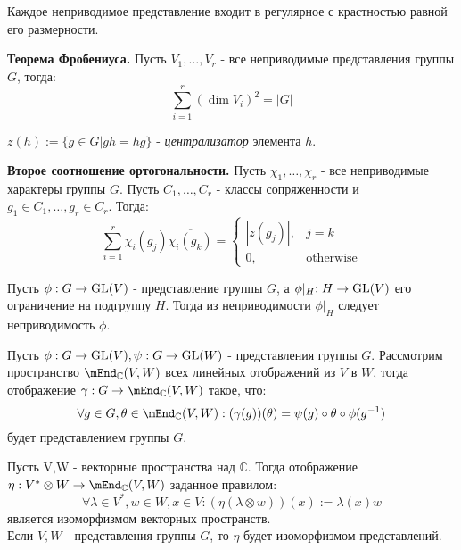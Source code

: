 \begin{ass}
Каждое неприводимое представление входит в регулярное с крастностью равной его размерности.
\end{ass}

\begin{thm}
\textbf{Теорема Фробениуса.} Пусть $V_1,\ldots,V_r$ - все неприводимые представления группы $G$, тогда:
$$\sum_{i=1}^r(\dim V_i)^2 = |G|$$
\end{thm}

\begin{defi}
$z(h):=\{ g\in G | gh=hg\}$ - \textit{централизатор} элемента $h$.
\end{defi}

\begin{thm}
\textbf{Второе соотношение ортогональности.} Пусть $\chi_1,\ldots,\chi_r$ - все неприводимые характеры группы $G$. Пусть $C_1,\ldots,C_r$ - классы сопряженности и $g_1\in C_1,\ldots,g_r\in C_r$. Тогда:
\begin{equation*}
\sum_{i=1}^r\chi_i(g_j)\overline{\chi_i(g_k)} = 
 \begin{cases}
   |z(g_j)|, & j=k\\
   0, &\text{otherwise}
 \end{cases}
\end{equation*}
\end{thm}

\begin{ass}
Пусть ${\phi:G\to\operatorname{GL}(V)}$ - представление группы $G$, а ${\phi\lvert_H:H\to\operatorname{GL}(V)}$ его ограничение на подгруппу $H$. Тогда из неприводимости ${\phi\lvert_H}$ следует неприводимость ${\phi}$.
\end{ass}

\begin{ass}
Пусть $\phi:G\to\operatorname{GL}(V),\psi:G\to\operatorname{GL}(W)$ - представления группы $G$. Рассмотрим пространство $\mEnd_{\mathbb{C}}(V,W)$ всех линейных отображений из $V$ в $W$, тогда отображение $\gamma:G\to\mEnd_{\mathbb{C}}(V,W)$ такое, что:
$$\forall g\in G,\theta\in \mEnd_{\mathbb{C}}(V,W): (\gamma(g))(\theta) = \psi(g)\circ\theta\circ\phi(g^{-1})$$
будет представлением группы $G$.
\end{ass}

\begin{ass}
Пусть V,W - векторные пространства над $\mathbb{C}$. Тогда отображение ${\eta:V^{*}\otimes W\to\mEnd_{\mathbb{C}}(V,W)}$ заданное правилом: $$\forall \lambda\in V^{*},w\in W,x\in V:(\eta(\lambda\otimes w))(x):=\lambda(x)w$$
является изоморфизмом векторных пространств.\\ Если $V,W$ - представления группы $G$, то $\eta$ будет изоморфизмом представлений.
\end{ass}

